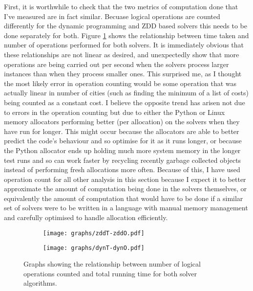 \documentclass[12pt,a4paper,twoside,openright]{report}
\begin{document}
First, it is worthwhile to check that the two metrics of computation done that I've measured are in fact similar. Becuase logical operations are counted differently for the dynamic programming and ZDD based solvers this needs to be done separately for both. Figure \ref{timeoperations} shows the relationship between time taken and number of operations performed for both solvers. It is immediately obvious that these relationships are not linear as desired, and unexpectedly show that more operations are being carried out per second when the solvers process larger instances than when they process smaller ones. This surprised me, as I thought the most likely error in operation counting would be some operation that was actually linear in number of cities (such as finding the minimum of a list of costs) being counted as a constant cost. I believe the opposite trend has arisen not due to errors in the operation counting but due to either the Python or Linux memory allocators performing better (per allocation) on the solvers when they have run for longer. This might occur because the allocators are able to better predict the code's behaviour and so optimise for it as it runs longer, or because the Python allocator ends up holding much more system memory in the longer test runs and so can work faster by recycling recently garbage collected objects instead of performing fresh allocations more often. Because of this, I have used operation count for all other analysis in this section because I expect it to better approximate the amount of computation being done in the solvers themselves, or equivalently the amount of computation that would have to be done if a similar set of solvers were to be written in a language with manual memory management and carefully optimised to handle allocation efficiently.

\begin{figure}[tbh]
\centering

\begin{subfigure}[b]{0.8\textwidth}
\centering
\texttt{[image: graphs/zddT-zddO.pdf]}
\caption{}
\end{subfigure}
\begin{subfigure}[b]{0.8\textwidth}
\centering
\texttt{[image: graphs/dynT-dynO.pdf]}
\caption{}
\end{subfigure}

\caption{Graphs showing the relationship between number of logical operations counted and total running time for both solver algorithms.}
\label{timeoperations}
\end{figure}
\end{document}
